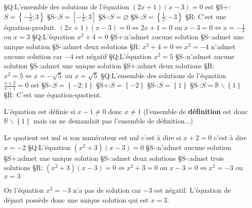 
%
§Q:L'ensemble des solutions de l'équation $\left(2x+1\right)\left(x-3\right)=0$ est
§S+:$S=\left\{ -\frac{1}{2} ; 3 \right\}$
§S-:$S=\left[-\frac{1}{2} ; 3\right]$
§S-:$S=\varnothing$
§S-:$S=\left\{ \frac{1}{2} ; -3 \right\}$
§R: C'est une équation-produit. $\left(2x+1\right)\left(x-3\right)=0  \Leftrightarrow   2x+1=0 $ ou $ x-3=0  \Leftrightarrow  x=-\frac{1}{2} $ ou $ x=3$
§Q:L'équation $x^{2}+4=0$
§S+:n'admet aucune solution
§S-:admet une unique solution
§S-:admet deux solutions
§R: $x^{2}+4=0  \Leftrightarrow   x^{2} = -4 $ n'admet aucune solution car $-4$ est négatif
§Q:L'équation $x^{2}=5$
§S-:n'admet aucune solution
§S-:admet une unique solution
§S+:admet deux solutions
§R: $x^{2}=5  \Leftrightarrow   x = -\sqrt{5} $ ou  $x = \sqrt{5} $
§Q:L'ensemble des solutions de l'équation $\frac{x+2}{x-1}=0$ est
§S-:$S=\left\{ -2 ; 1 \right\}$
§S+:$S=\left\{-2\right\}$
§S-:$S=\left\{1\right\}$
§S-:$S=\mathbb{R}\backslash\left\{1\right\}$
§R: C'est une équation-quotient.
\par
L'équation est définie si $x-1\neq 0$ donc $x\neq 1$ (l'ensemble de \textbf{définition} est donc $\mathbb{R}\backslash\left\{ 1 \right\}$ mais on ne demandait pas l'ensemble de définition...)
\par
Le quotient est nul si son numérateur est nul c'est à dire si $x+2=0$ c'est à dire $x=-2$
§Q:L'équation $\left(x^{2}+3\right)\left(x-3\right)=0$
§S-:n'admet aucune solution
§S+:admet une unique solution
§S-:admet deux solutions
§S-:admet trois solutions
§R: $\left(x^{2}+3\right)\left(x-3\right)=0  \Leftrightarrow  x^{2}+3=0 $ ou $ x-3=0  \Leftrightarrow  x^{2}=-3 $ ou $ x=3 $
\par
Or l'équation $x^{2}=-3 $ n'a pas de solution car $-3$ est négatif. L'équation de départ possède donc une unique solution qui est $x=3$.

